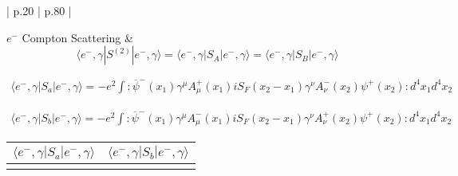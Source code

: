 \documentclass[a4]{article}
\begin{document}
    \begingroup
        \begin{longtable}{| p{} | p{} |}
        \hline

        $e^{-}$ Compton Scattering &
            \begin{equation}
                \langle e^{-}, \gamma | S^{(2)} | e^{-}, \gamma \rangle = \langle e^{-}, \gamma | S_{A} | e^{-}, \gamma \rangle = \langle e^{-}, \gamma | S_{B} | e^{-}, \gamma \rangle
            \end{equation}

            \begin{equation}
                \begin{aligned}
                    \langle e^{-}, \gamma | S_{a} | e^{-}, \gamma \rangle = - e^{2} \int :\overline{\psi}^{-} (x_1) \gamma^{\mu} A_{\mu}^{+} (x_1) i S_{F} (x_2 - x_1) \gamma^{\nu} A_{\nu}^{-} (x_2) \psi^{+} (x_2): d^{4} x_{1} d^{4} x_{2}
                \end{aligned}
            \end{equation}

            \begin{equation}
                \begin{aligned}
                    \langle e^{-}, \gamma | S_{b} | e^{-}, \gamma \rangle = - e^{2} \int :\overline{\psi}^{-} (x_1) \gamma^{\mu} A_{\mu}^{-} (x_1) i S_{F} (x_2 - x_1) \gamma^{\nu} A_{\nu}^{+} (x_2) \psi^{+} (x_2): d^{4} x_{1} d^{4} x_{2}
                \end{aligned}
            \end{equation}

            \begin{center}
                \begin{tabular}{|c|c|}
                    \hline
                    $\langle e^{-}, \gamma | S_{a} | e^{-}, \gamma \rangle$ & $\langle e^{-}, \gamma | S_{b} | e^{-}, \gamma \rangle$ \\
                    \hline
                    \begin{tikzpicture}
                        \begin{feynman}
                            \vertex [label = right: $x_1$] (a);
                            \vertex [below = of a, label = left: $x_2$] (b);
                            \vertex [above right = of a, label = $\gamma$] (c);
                            \vertex [above left = of a, label = $e^{-}$] (d);
                            \vertex [below left = of b, label = $\gamma$] (e);
                            \vertex [below right = of b, label = $e^{+}$] (f);
            

\end{feynman}
\end{tikzpicture}
\end{tabular}
\end{center}
\end{longtable}
\end{document}
